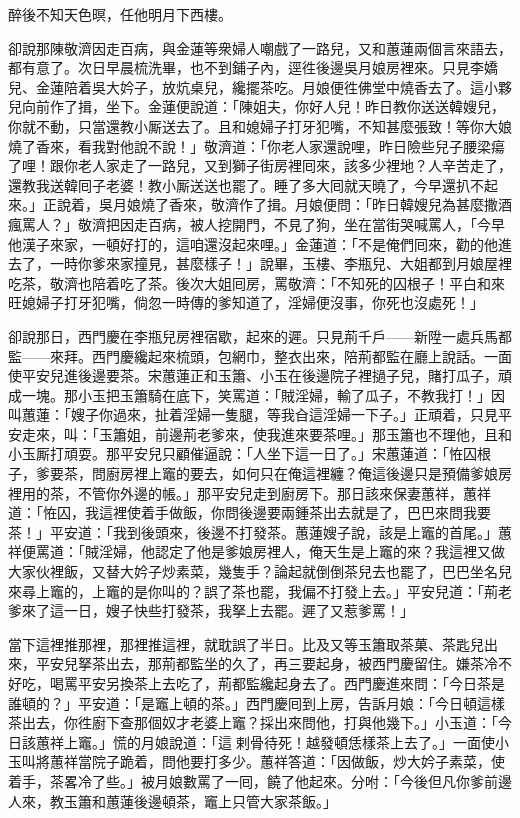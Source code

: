 \begin{myquote} 
醉後不知天色暝，任他明月下西樓。
\end{myquote} 

卻說那陳敬濟因走百病，與金蓮等衆婦人嘲戲了一路兒，又和蕙蓮兩個言來語去，都有意了。次日早晨梳洗畢，也不到鋪子內，逕徃後邊吳月娘房裡來。只見李嬌兒、金蓮陪着吳大妗子，放炕桌兒，纔擺茶吃。月娘便徃佛堂中燒香去了。這小夥兒向前作了揖，坐下。金蓮便說道：「陳姐夫，你好人兒！昨日教你送送韓嫂兒，你就不動，只當還教小厮送去了。且和媳婦子打牙犯嘴，不知甚麼張致！{}等你大娘燒了香來，看我對他說不說！」敬濟道：「你老人家還說哩，昨日險些兒子腰梁瘍了哩！跟你老人家走了一路兒，又到獅子街房裡囘來，該多少裡地？人辛苦走了，還教我送韓囘子老婆！教小厮送送也罷了。睡了多大囘就天曉了，今早還扒不起來。」正說着，吳月娘燒了香來，敬濟作了揖。月娘便問：「昨日韓嫂兒為甚麼撒酒瘋罵人？」敬濟把因走百病，被人挖開門，不見了狗，坐在當街哭喊罵人，「今早他漢子來家，一頓好打的，{}這咱還沒起來哩。」金蓮道：「不是俺們囘來，勸的他進去了，一時你爹來家撞見，甚麼樣子！」說畢，玉樓、李瓶兒、大姐都到月娘屋裡吃茶，敬濟也陪着吃了茶。後次大姐囘房，罵敬濟：「不知死的囚根子！平白和來旺媳婦子打牙犯嘴，倘忽一時傳的爹知道了，淫婦便沒事，{}{}你死也沒處死！」

卻說那日，西門慶在李瓶兒房裡宿歇，起來的遲。只見荊千戶——新陞一處兵馬都監——來拜。西門慶纔起來梳頭，包網巾，整衣出來，陪荊都監在廳上說話。一面使平安兒進後邊要茶。宋蕙蓮正和玉簫、小玉在後邊院子裡撾子兒，賭打瓜子，頑成一塊。那小玉把玉簫騎在底下，笑罵道：「賊淫婦，輸了瓜子，不教我打！」因叫蕙蓮：「嫂子你過來，扯着淫婦一隻腿，等我㒲這淫婦一下子。」{}正頑着，只見平安走來，叫：「玉簫姐，前邊荊老爹來，使我進來要茶哩。」那玉簫也不理他，且和小玉厮打頑耍。那平安兒只顧催逼說：「人坐下這一日了。」宋蕙蓮道：「恠囚根子，爹要茶，問廚房裡上竈的要去，如何只在俺這裡纏？俺這後邊只是預備爹娘房裡用的茶，不管你外邊的帳。」那平安兒走到廚房下。那日該來保妻蕙祥，蕙祥道：「恠囚，我這裡使着手做飯，你問後邊要兩鍾茶出去就是了，巴巴來問我要茶！」平安道：「我到後頭來，後邊不打發茶。蕙蓮嫂子說，該是上竈的首尾。」蕙祥便罵道：「賊淫婦，他認定了他是爹娘房裡人，{}俺天生是上竈的來？我這裡又做大家伙裡飯，又替大妗子炒素菜，幾隻手？論起就倒倒茶兒去也罷了，巴巴坐名兒來尋上竈的，上竈的是你叫的？{}誤了茶也罷，我偏不打發上去。」平安兒道：「荊老爹來了這一日，嫂子快些打發茶，我拏上去罷。遲了又惹爹罵！」

當下這裡推那裡，那裡推這裡，就耽誤了半日。比及又等玉簫取茶菓、茶匙兒出來，平安兒拏茶出去，那荊都監坐的久了，再三要起身，被西門慶留住。嫌茶冷不好吃，喝罵平安另換茶上去吃了，荊都監纔起身去了。西門慶進來問：「今日茶是誰頓的？」平安道：「是竈上頓的茶。」西門慶囘到上房，告訴月娘：「今日頓這樣茶出去，你徃廚下查那個奴才老婆上竈？採出來問他，打與他幾下。」小玉道：「今日該蕙祥上竈。」慌的月娘說道：「這𢱉剌骨待死！越發頓恁樣茶上去了。」一面使小玉叫將蕙祥當院子跪着，問他要打多少。蕙祥答道：「因做飯，炒大妗子素菜，使着手，茶畧冷了些。」被月娘數罵了一囘，饒了他起來。分咐：「今後但凡你爹前邊人來，教玉簫和蕙蓮後邊頓茶，竈上只管大家茶飯。」

